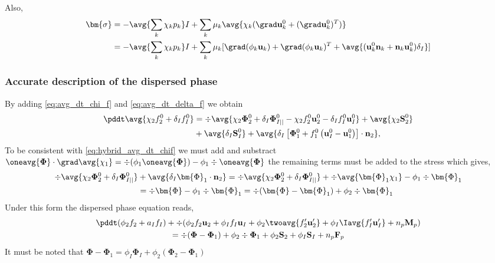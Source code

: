 Also, 
\begin{align*}
    \bm{\sigma}
    &= -\avg{\sum_k \chi_k p_k} I + \sum_k\mu_k \avg{\chi_k  (\grad\textbf{u}_k^0+(\grad\textbf{u}_k^0)^T)}\\
    &= -\avg{\sum_k \chi_k p_k} I + \sum_k\mu_k [\grad (\phi_k\textbf{u}_k)+ \grad (\phi_k\textbf{u}_k)^T
    + \avg{(\textbf{u}_k^0  \textbf{n}_k +  \textbf{n}_k\textbf{u}_k^0)\delta_I}]
\end{align*}

\subsubsection{Accurate description of the dispersed phase}


By adding \ref{eq:avg_dt_chi_f} and \ref{eq:avg_dt_delta_f} we obtain 
\begin{align*}
    \pddt \avg{\chi_2 f_2^0 +\delta_If_I^0}
    &= \div \avg{\chi_2 \mathbf{\Phi}_2^0 + \delta_I \mathbf{\Phi}_{I||}^0 - \chi_2 f_2^0 \textbf{u}_2^0 - \delta_I f_I^0 \textbf{u}_I^0}
    + \avg{\chi_2 \textbf{S}_2^0 }\\
    &+ \avg{\delta_I\textbf{S}_I^0} 
    + \avg{\delta_I\left[
        \mathbf{\Phi}_1^0
        + f_1^0
        \left(
            \textbf{u}_I^0
            - \textbf{u}_1^0
        \right)
    \right]
    \cdot \textbf{n}_2},
\end{align*}
To be consistent with \ref{eq:hybrid_avg_dt_chif} we must add and substract $\oneavg{\mathbf{\Phi}}\cdot\grad \avg{\chi_1} = \div  (\phi_1 \oneavg{\mathbf{\Phi}}) - \phi_1 \div \oneavg{\mathbf{\Phi}}$ the remaining terms must be added to the stress which gives,
\begin{align*}
    \div \avg{\chi_2 \mathbf{\Phi}_2^0 + \delta_I \mathbf{\Phi}_{I||}^0}
    & + \avg{\delta_I \bm{\Phi}_1 \cdot \textbf{n}_2}
    =
    \div \avg{\chi_2 \mathbf{\Phi}_2^0 + \delta_I \mathbf{\Phi}_{I||}^0}
    + \div \avg{\bm{\Phi}_1 \chi_1} 
     - \phi_1 \div \bm{\Phi}_1\\
    &= \div \bm{\Phi}
     - \phi_1 \div \bm{\Phi}_1
     =  \div (\bm{\Phi} - \bm{\Phi}_1)
     + \phi_2 \div \bm{\Phi}_1\\
\end{align*}
Under this form the dispersed phase equation reads, 
\begin{multline*}
    \pddt (\phi_2 f_2 +a_If_I)
    + \div (
        \phi_2 f_2 \textbf{u}_2
        + \phi_I f_I \textbf{u}_I
        + \phi_2 \twoavg{f_2'\textbf{u}_2'} 
        + \phi_I \Iavg{f_I'\textbf{u}_I'}
        + n_p \textbf{M}_p 
        )\\
    = 
    \div (\mathbf{\Phi}  - \mathbf{\Phi}_1 )
    + \phi_2 \div \mathbf{\Phi}_1 
    + \phi_2 \textbf{S}_2
    + \phi_I \textbf{S}_I
    + n_p\textbf{F}_p
\end{multline*}
It must be noted that $\mathbf{\Phi}  - \mathbf{\Phi}_1 
= \phi_I\mathbf{\Phi}_I+\phi_2(\mathbf{\Phi}_2  - \mathbf{\Phi}_1) $

